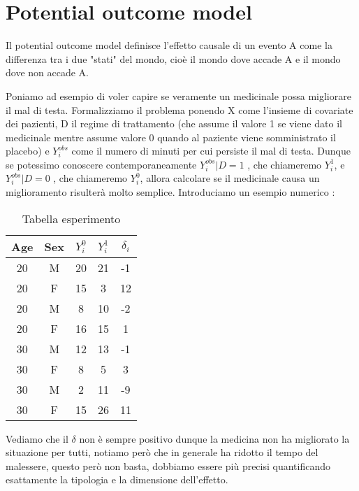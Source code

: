 \chapter{Potential outcome model}
\label{chapt:PotentialOM}
Il potential outcome model definisce l'effetto causale di un evento A come la differenza tra i due "stati" del mondo, cioè il mondo dove accade A e il mondo dove non accade A.

Poniamo ad esempio di voler capire se veramente un medicinale possa migliorare il mal di testa. Formalizziamo il problema ponendo X come l'insieme di covariate dei pazienti, D il regime di trattamento (che assume il valore 1 se viene dato il medicinale mentre assume valore 0 quando al paziente viene somministrato il placebo) e $Y^{obs}_i$ come il numero di minuti per cui persiste il mal di testa. 
Dunque se potessimo conoscere contemporaneamente  $Y^{obs}_i|D=1$ , che chiameremo $Y^{1}_i$, e $Y^{obs}_i|D=0$ , che chiameremo $Y^{0}_i$, allora calcolare se il medicinale causa un miglioramento risulterà molto semplice. Introduciamo un esempio numerico : 
\begin{table}[H]
\centering
\begin{tabular}{|c|c|c|c|c|}
\hline
Age & Sex & $Y^{0}_i$ & $Y^{1}_i$ & $\delta_i$ \\ \hline
20 & M & 20 & 21 & -1  \\ \hline
20 & F & 15 & 3 & 12 \\ \hline
20 & M & 8 & 10 & -2 \\ \hline
20 & F & 16 & 15 & 1 \\ \hline
30 & M & 12 & 13 & -1 \\ \hline
30 & F & 8 & 5 & 3 \\ \hline
30 & M & 2 & 11 & -9  \\ \hline
30 & F & 15 & 26 & 11 \\ \hline
\end{tabular}
\caption{Tabella esperimento }
\end{table}
Vediamo che il $\delta$ non è sempre positivo dunque la medicina non ha migliorato la situazione per tutti, notiamo però che in generale ha ridotto il tempo del malessere, questo però non basta, dobbiamo essere più precisi quantificando esattamente la tipologia e la dimensione dell'effetto.

